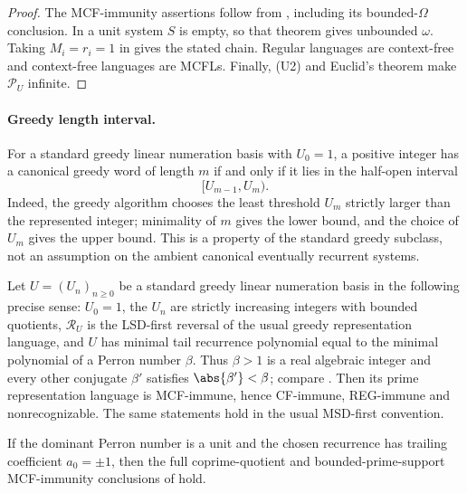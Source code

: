 \begin{proof}
  The MCF-immunity assertions follow from
  , including its
  bounded-\(\Omega\) conclusion. In a unit system \(S\) is empty, so
  that theorem gives unbounded \(\omega\). Taking
  \(M_i=r_i=1\) in
   gives the stated chain.
  Regular languages are context-free and context-free languages are
  MCFLs. Finally, \textup{(U2)} and Euclid's theorem make
  \(\mathcal P_U\) infinite.
\end{proof}

\paragraph{Greedy length interval.}
For a standard greedy linear numeration basis with \(U_0=1\), a positive
integer has a canonical greedy word of length \(m\) if and only if it lies
in the half-open interval
\[
  [U_{m-1},U_m).
\]
Indeed, the greedy algorithm chooses the least threshold \(U_m\) strictly
larger than the represented integer; minimality of \(m\) gives the lower
bound, and the choice of \(U_m\) gives the upper bound. This is a property
of the standard greedy subclass, not an assumption on the ambient
canonical eventually recurrent systems.

\begin{corollary}
  \label{cor:linear-perron-prime-cf-immunity}
  Let \(U=(U_n)_{n\ge0}\) be a standard greedy linear numeration basis in
  the following precise sense: \(U_0=1\), the \(U_n\) are strictly
  increasing integers with bounded quotients, \(\mathcal R_U\) is the LSD-first
  reversal of the usual greedy representation language, and \(U\)
  has minimal tail recurrence polynomial equal to the minimal polynomial
  of a Perron number \(\beta\). Thus
  \(\beta>1\) is a real algebraic integer and every other conjugate
  \(\beta'\) satisfies \(\abs{\beta'}<\beta\); compare
  \cite{LindMarcus1995,Rigo2014Vol2}. Then its prime
  representation language is MCF-immune, hence CF-immune, REG-immune and
  nonrecognizable. The same statements hold in the usual MSD-first
  convention.

  If the dominant Perron number is a unit and the chosen recurrence has
  trailing coefficient \(a_0=\pm1\), then the full coprime-quotient and
  bounded-prime-support MCF-immunity conclusions of
   hold.
\end{corollary}

